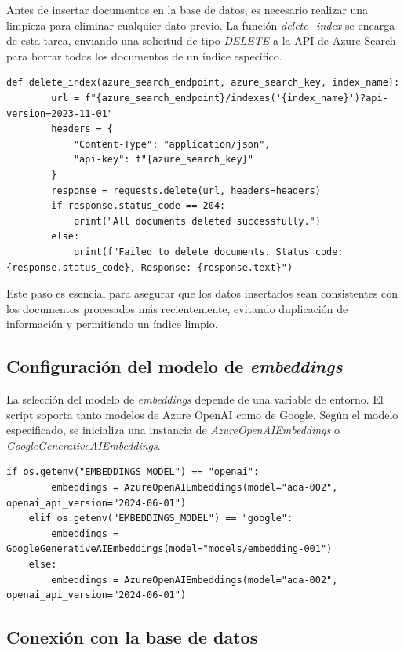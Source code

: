 Antes de insertar documentos en la base de datos, es necesario realizar una limpieza para eliminar cualquier dato previo. La función 
\textit{delete\_index} se encarga de esta tarea, enviando una solicitud de tipo \textit{DELETE} a la API de Azure Search para borrar todos 
los documentos de un índice específico.

\begin{lstlisting}[label=cod:update-db-2,caption=Configuración del índice de búsqueda.]
	def delete_index(azure_search_endpoint, azure_search_key, index_name):
		url = f"{azure_search_endpoint}/indexes('{index_name}')?api-version=2023-11-01"
		headers = {
			"Content-Type": "application/json",
			"api-key": f"{azure_search_key}"
		}
		response = requests.delete(url, headers=headers)
		if response.status_code == 204:
			print("All documents deleted successfully.")
		else:
			print(f"Failed to delete documents. Status code: {response.status_code}, Response: {response.text}")
\end{lstlisting}

Este paso es esencial para asegurar que los datos insertados sean consistentes con los documentos procesados más recientemente, evitando 
duplicación de información y permitiendo un índice limpio.

\subsection{Configuración del modelo de \textit{embeddings}}

La selección del modelo de \textit{embeddings} depende de una variable de entorno. El script soporta tanto modelos de Azure OpenAI como de Google. 
Según el modelo especificado, se inicializa una instancia de \textit{AzureOpenAIEmbeddings} o \textit{GoogleGenerativeAIEmbeddings}.

\begin{lstlisting}[label=cod:update-db-3,caption=Configuración del modelo de \textit{embeddings}.]
	if os.getenv("EMBEDDINGS_MODEL") == "openai":
		embeddings = AzureOpenAIEmbeddings(model="ada-002", openai_api_version="2024-06-01")
	elif os.getenv("EMBEDDINGS_MODEL") == "google":    
		embeddings = GoogleGenerativeAIEmbeddings(model="models/embedding-001")
	else:
		embeddings = AzureOpenAIEmbeddings(model="ada-002", openai_api_version="2024-06-01")
\end{lstlisting}

\subsection{Conexión con la base de datos}

